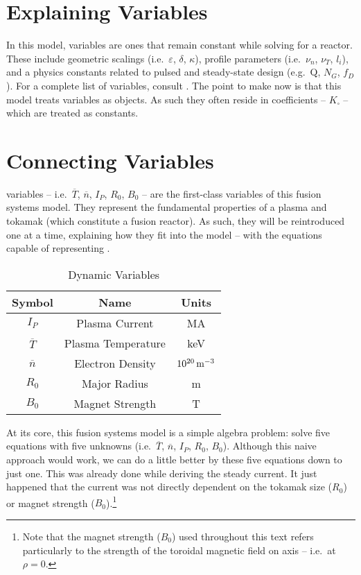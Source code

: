 \section{Explaining  Variables}

In this model,  variables are ones that remain constant while solving for a reactor. These include geometric scalings (i.e.\ $\varepsilon$, $\delta$, $\kappa$), profile parameters (i.e.\ $\nu_n$, $\nu_T$, $l_i$), and a  physics constants related to pulsed and steady-state design (e.g.\ Q, $N_G$, $f_D$). For a complete list of  variables, consult . The point to make now is that this model treats  variables as  objects. As such they often reside in  coefficients -- $K_\square$ -- which are treated as constants.

\section{Connecting  Variables}

 variables -- i.e.\ $\overline T$, $\overline n$, $I_P$, $R_0$, $B_0$ -- are the first-class variables of this fusion systems model. They represent the fundamental properties of a plasma and tokamak (which constitute a fusion reactor). As such, they will be reintroduced one at a time, explaining how they fit into the model -- with the equations capable of representing . 

\begin{table}[h!]
\centering
\caption{Dynamic Variables}
\begin{tabular}{ c|c|c }

\textbf{Symbol} & \textbf{Name} & \textbf{Units} \\
\hline
$I_P$ & Plasma Current & MA \\
$\overline{T}$ & Plasma Temperature & keV \\
$\overline{n}$ & Electron Density & $10^{20} \, \textnormal{m}^{-3}$ \\
$R_0$ &  Major Radius & m \\
$B_0$ &  Magnet Strength & T
\end{tabular}
\label{table:dynamic}
\end{table}

At its core, this fusion systems model is a simple algebra problem: solve five equations with five unknowns (i.e.\ $\overline T$, $\overline n$, $I_P$, $R_0$, $B_0$). Although this naive approach would work, we can do a little better by  these five equations down to just one. This was already done while deriving the steady current. It just happened that the current was not directly dependent on the tokamak size ($R_0$) or magnet strength ($B_0$).\footnote{Note that the magnet strength ($B_0$) used throughout this text refers particularly to the strength of the toroidal magnetic field on axis -- i.e.\ at $\rho = 0$.}

